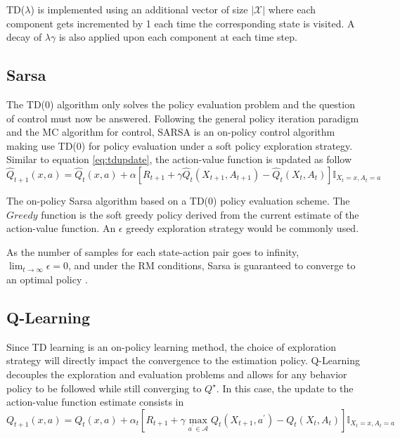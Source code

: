 \documentclass[12pt, oneside, extrafontsizes]{memoir}  %
\def\optimal{\star}
\theoremstyle{plain}
\theoremstyle{definition}
\begin{document}
TD($\lambda$) is implemented using an additional vector of size $\left\vert
\mathcal{X} \right\vert$ where each component gets incremented by 1 each time the
corresponding state is visited. A decay of $\lambda \gamma$ is also applied upon
each component at each time step. 

\subsection{Sarsa}
The TD(0) algorithm only solves the policy evaluation problem and the question of
control must now be answered. Following the general policy iteration paradigm and
the MC algorithm for control, SARSA is an on-policy control algorithm making use 
TD(0) for policy evaluation under a soft policy exploration strategy. Similar to equation
\ref{eq:tdupdate}, the action-value function is updated as follow
\begin{equation}
\hat{Q}_{t+1}(x, a) = \hat{Q}_{t}(x, a) + \alpha \left[ R_{t+1} + \gamma \hat{Q}_t
(X_{t+1}, A_{t+1}) - \hat{Q}_t(X_t, A_t)\right] \mathbb{I}_{X_t = x, A_t = a}
\label{eq:sarsaupdate}
\end{equation}

\begin{algorithm}
\DontPrintSemicolon
{}
\caption{The on-policy Sarsa algorithm based on a TD(0) policy evaluation scheme.
The $Greedy$ function is the soft greedy policy derived from the current estimate of
the action-value function. An $\epsilon$ greedy exploration strategy would be
commonly used.}
\label{alg:sarsa}
\end{algorithm}

As the number of samples for each state-action pair goes to infinity, $\lim_{t \to
\infty} \epsilon = 0$, and under the RM conditions, Sarsa is guaranteed to converge to
an optimal policy \cite{Sutton1998}. 

\subsection{Q-Learning}

Since TD learning is an on-policy learning method, the choice of exploration strategy
will directly impact the convergence to the estimation policy. Q-Learning
\cite{Watkins1989} decouples the exploration and evaluation problems and allows for
any behavior policy to be followed while still converging to $Q^\optimal$. In this case,
the update to the action-value function estimate consists in
\begin{equation}
Q_{t+1} (x,a) = Q_t(x,a) + \alpha_t \left[ R_{t+1} + \gamma \max_{a^\prime \in
\mathcal{A}} Q_t(X_{t+1}, a^\prime) - Q_t(X_t, A_t) \right] \mathbb{I}_{X_t = x, A_t = a} 
\label{eq:qlearning-update}
\end{equation}
\end{document}
